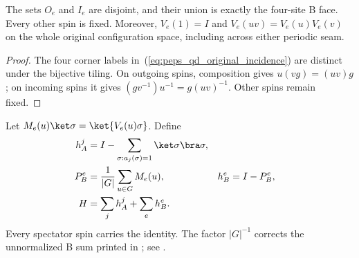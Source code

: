 \begin{theorem}
    \label{thm:peps_qd_original_action_support}

    The sets $O_e$ and $I_e$ are disjoint, and their union is exactly
    the four-site B face. Every other spin is fixed.
    Moreover, $V_e(1)=I$ and $V_e(uv)=V_e(u)V_e(v)$ on the whole
    original configuration space, including across either periodic seam.
\end{theorem}
\begin{proof}
    The four corner labels in~(\ref{eq:peps_qd_original_incidence}) are
    distinct under the bijective tiling. On outgoing spins, composition
    gives $u(vg)=(uv)g$; on incoming spins it gives
    $(gv^{-1})u^{-1}=g(uv)^{-1}$. Other spins remain fixed.
\end{proof}

\begin{definition}
    \label{def:peps_qd_original_hamiltonian}

    Let $M_e(u)\ket\sigma=\ket{V_e(u)\sigma}$. Define
    \begin{align}
        h_A^j&=I-\sum_{\sigma:a_j(\sigma)=1}\ket\sigma\bra\sigma,\\
        P_B^e&=\frac1{|G|}\sum_{u\in G}M_e(u),& h_B^e&=I-P_B^e,\\
        H&=\sum_j h_A^j+\sum_e h_B^e.
        \label{eq:peps_qd_original_hamiltonian}
    \end{align}
    Every spectator spin carries the identity. The factor $|G|^{-1}$
    corrects the unnormalized B sum printed in
    \cite[Section~7.2]{Schuch2010PEPS}; see
    \cite{gap:scp10_quantum_double_local_hamiltonian}.
\end{definition}

